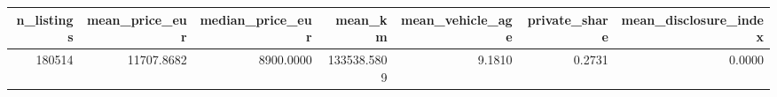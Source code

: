 \begin{tabular}{rrrrrrr}
\toprule
n\_listings & mean\_price\_eur & median\_price\_eur & mean\_km & mean\_vehicle\_age & private\_share & mean\_disclosure\_index \\
\midrule
180514 & 11707.8682 & 8900.0000 & 133538.5809 & 9.1810 & 0.2731 & 0.0000 \\
\bottomrule
\end{tabular}
